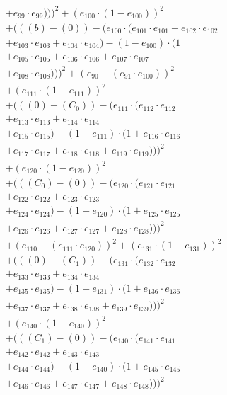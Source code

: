 \documentclass[10pt, a4paper]{article}
\begin{document}
\begin{align*}
& + e_{99} \cdot e_{99})))^{2} + (e_{100} \cdot (1 - e_{100}))^{2} \\
& + (((b) - (0)) - (e_{100} \cdot (e_{101} \cdot e_{101} + e_{102} \cdot e_{102} \\
& + e_{103} \cdot e_{103} + e_{104} \cdot e_{104}) - (1 - e_{100}) \cdot (1 \\
& + e_{105} \cdot e_{105} + e_{106} \cdot e_{106} + e_{107} \cdot e_{107} \\
& + e_{108} \cdot e_{108})))^{2} + (e_{90} - (e_{91} \cdot e_{100}))^{2} \\
& + (e_{111} \cdot (1 - e_{111}))^{2} \\
& + (((0) - (C_{0})) - (e_{111} \cdot (e_{112} \cdot e_{112} \\
& + e_{113} \cdot e_{113} + e_{114} \cdot e_{114} \\
& + e_{115} \cdot e_{115}) - (1 - e_{111}) \cdot (1 + e_{116} \cdot e_{116} \\
& + e_{117} \cdot e_{117} + e_{118} \cdot e_{118} + e_{119} \cdot e_{119})))^{2} \\
& + (e_{120} \cdot (1 - e_{120}))^{2} \\
& + (((C_{0}) - (0)) - (e_{120} \cdot (e_{121} \cdot e_{121} \\
& + e_{122} \cdot e_{122} + e_{123} \cdot e_{123} \\
& + e_{124} \cdot e_{124}) - (1 - e_{120}) \cdot (1 + e_{125} \cdot e_{125} \\
& + e_{126} \cdot e_{126} + e_{127} \cdot e_{127} + e_{128} \cdot e_{128})))^{2} \\
& + (e_{110} - (e_{111} \cdot e_{120}))^{2} + (e_{131} \cdot (1 - e_{131}))^{2} \\
& + (((0) - (C_{1})) - (e_{131} \cdot (e_{132} \cdot e_{132} \\
& + e_{133} \cdot e_{133} + e_{134} \cdot e_{134} \\
& + e_{135} \cdot e_{135}) - (1 - e_{131}) \cdot (1 + e_{136} \cdot e_{136} \\
& + e_{137} \cdot e_{137} + e_{138} \cdot e_{138} + e_{139} \cdot e_{139})))^{2} \\
& + (e_{140} \cdot (1 - e_{140}))^{2} \\
& + (((C_{1}) - (0)) - (e_{140} \cdot (e_{141} \cdot e_{141} \\
& + e_{142} \cdot e_{142} + e_{143} \cdot e_{143} \\
& + e_{144} \cdot e_{144}) - (1 - e_{140}) \cdot (1 + e_{145} \cdot e_{145} \\
& + e_{146} \cdot e_{146} + e_{147} \cdot e_{147} + e_{148} \cdot e_{148})))^{2} \\

\end{align*}
\end{document}

